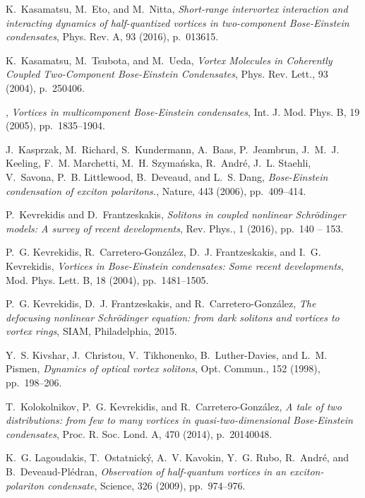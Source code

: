 \documentclass[aps,prb,twocolumn,superscriptaddress,nofootinbib]{revtex4}
\begin{document}
\begin{thebibliography}{10}
{\sc K.~Kasamatsu, M.~Eto, and M.~Nitta}, {\em Short-range intervortex
  interaction and interacting dynamics of half-quantized vortices in
  two-component {Bose}-{Einstein} condensates}, Phys. Rev. A, 93 (2016),
  p.~013615.

{\sc K.~Kasamatsu, M.~Tsubota, and M.~Ueda}, {\em Vortex {Molecules} in
  {Coherently} {Coupled} {Two}-{Component} {Bose}-{Einstein} {Condensates}},
  Phys. Rev. Lett., 93 (2004), p.~250406.

\leavevmode\vrule height 2pt depth -1.6pt width 23pt, {\em Vortices in
  multicomponent {B}ose-{E}instein condensates}, Int. J. Mod. Phys. B, 19
  (2005), pp.~1835--1904.

{\sc J.~Kasprzak, M.~Richard, S.~Kundermann, A.~Baas, P.~Jeambrun, J.~M.~J.
  Keeling, F.~M. Marchetti, M.~H. Szyma\'{n}ska, R.~Andr\'{e}, J.~L. Staehli,
  V.~Savona, P.~B. Littlewood, B.~Deveaud, and L.~S. Dang}, {\em {Bose-Einstein
  condensation of exciton polaritons.}}, Nature, 443 (2006), pp.~409--414.

{\sc P.~Kevrekidis and D.~Frantzeskakis}, {\em Solitons in coupled nonlinear
  {Schr{\"o}dinger} models: A survey of recent developments}, Rev. Phys., 1
  (2016), pp.~140 -- 153.

{\sc P.~G. Kevrekidis, R.~Carretero-Gonz\'alez, D.~J. Frantzeskakis, and I.~G.
  Kevrekidis}, {\em Vortices in {B}ose-{E}instein condensates: Some recent
  developments}, Mod. Phys. Lett. B, 18 (2004), pp.~1481--1505.

{\sc P.~G. Kevrekidis, D.~J. Frantzeskakis, and R.~Carretero-Gonz\'{a}lez},
  {\em The defocusing nonlinear Schr{\"o}dinger equation: from dark solitons
  and vortices to vortex rings}, SIAM, Philadelphia, 2015.

{\sc Y.~S. Kivshar, J.~Christou, V.~Tikhonenko, B.~Luther-Davies, and L.~M.
  Pismen}, {\em Dynamics of optical vortex solitons}, Opt. Commun., 152 (1998),
  pp.~198--206.

{\sc T.~Kolokolnikov, P.~G. Kevrekidis, and R.~Carretero-Gonz{\'a}lez}, {\em A
  tale of two distributions: from few to many vortices in quasi-two-dimensional
  {Bose-Einstein} condensates}, Proc. R. Soc. Lond. A, 470 (2014), p.~20140048.

{\sc K.~G. Lagoudakis, T.~Ostatnick\'{y}, A.~V. Kavokin, Y.~G. Rubo,
  R.~Andr\'{e}, and B.~Deveaud-Pl\'{e}dran}, {\em Observation of half-quantum
  vortices in an exciton-polariton condensate}, Science, 326 (2009),
  pp.~974--976.


\end{thebibliography}
\end{document}
